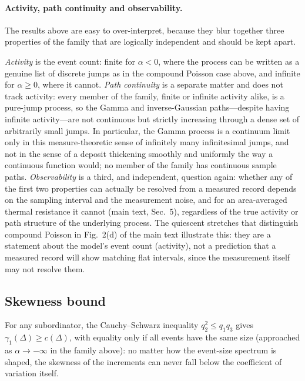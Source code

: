 \documentclass[preprint,12pt]{elsarticle}
\begin{document}
\paragraph*{Activity, path continuity and observability.}
\label{app:three_distinctions}
The results above are easy to over-interpret, because they blur together
three properties of the family that are logically independent and should
be kept apart.

\emph{Activity} is the event count: finite for $\alpha<0$, where the
process can be written as a genuine list of discrete jumps as in the
compound Poisson case above, and infinite for $\alpha\ge0$, where it
cannot. \emph{Path continuity} is a separate matter and does not track
activity: every member of the family, finite or infinite activity alike, is
a pure-jump process, so the Gamma and inverse-Gaussian paths---despite
having infinite activity---are not continuous but strictly increasing
through a dense set of arbitrarily small jumps. In particular, the Gamma
process is a continuum limit only in this measure-theoretic sense of
infinitely many infinitesimal jumps, and not in the sense of a deposit
thickening smoothly and uniformly the way a continuous function would; no
member of the family has continuous sample paths. \emph{Observability} is a
third, and independent, question again: whether any of the first two
properties can actually be resolved from a measured record depends on the
sampling interval and the measurement noise, and for an area-averaged
thermal resistance it cannot (main text, Sec.~5), regardless of the true
activity or path structure of the underlying process. The quiescent
stretches that distinguish compound Poisson in Fig.~2(d) of the main text
illustrate this: they are a statement about the model's event count
(activity), not a prediction that a measured record will show matching
flat intervals, since the measurement itself may not resolve them.

\subsection{Skewness bound}
\label{app:skew_bound}

For any subordinator, the Cauchy--Schwarz inequality
$q_2^2\le q_1q_3$ gives $\gamma_1(\Delta)\ge c(\Delta)$, with equality only
if all events have the same size (approached as $\alpha\to-\infty$ in the family above):
no matter how the event-size spectrum is shaped, the skewness of the
increments can never fall below the coefficient of variation itself.
\end{document}
